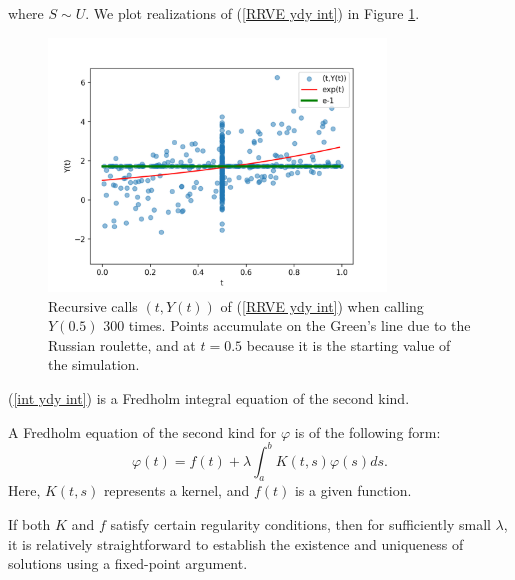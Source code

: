 \documentclass[a4paper,12pt]{article}
\begin{document}
\begin{example}[$y_t=y$ average condition]
  where $S \sim U$. We plot realizations of
  (\ref{RRVE ydy int}) in Figure \ref{fig:ydy int}.

  \begin{figure}[h!]
    \centering
    \includegraphics[width=0.8\textwidth]{plots/ydy int.png}
    \caption{Recursive calls $(t,Y(t))$ of (\ref{RRVE ydy int}) when
      calling $Y(0.5)$ $300$ times. Points accumulate on
      the Green's line due to the Russian roulette,
      and at  $t=0.5$ because it is the starting
      value of the simulation.
    }
    \label{fig:ydy int}
  \end{figure}

\end{example}

(\ref{int ydy int}) is a Fredholm integral
equation of the second kind.

\begin{definition}
  A Fredholm equation of the second kind for $\varphi$  is of the following form:
  \begin{equation}
    \varphi(t)=f(t)+\lambda \int_a^b K(t, s) \varphi(s) ds.
  \end{equation}
  Here, $K(t, s)$ represents a kernel, and $f(t)$ is a given function.
\end{definition}

If both $K$ and $f$ satisfy certain regularity conditions, then for sufficiently
small $\lambda$, it is relatively straightforward to establish the existence
and uniqueness of solutions using a fixed-point argument.
\end{document}
